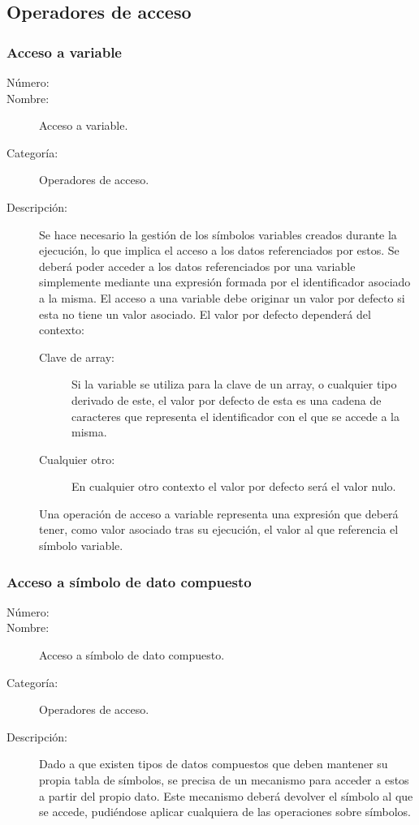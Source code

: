 \subsection{Operadores de acceso}
\subsubsection{Acceso a variable}
	\begin{description}
		\item [Número:] \cn
		\item [Nombre:] Acceso a variable.
		\item [Categoría:] Operadores de acceso.
		\item [Descripción:] Se hace necesario la gestión de los símbolos variables creados durante la ejecución, lo que implica el
		acceso a los datos referenciados por estos. Se deberá poder acceder a los datos referenciados por una variable
		simplemente mediante una expresión formada por el identificador asociado a la misma. El acceso a una variable debe originar un
		valor por defecto si esta no tiene un valor asociado. El valor por defecto dependerá del contexto:  
		\begin{description}
			\item[Clave de array:] Si la variable se utiliza para la clave de un array, o cualquier tipo
			derivado de este, el valor por defecto de esta es una cadena de caracteres que representa
			el identificador con el que se accede a la misma.
			\item [Cualquier otro:] En cualquier otro contexto el valor por defecto será el valor nulo.
		\end{description}
		Una operación de acceso a variable representa una expresión que deberá tener, como valor asociado tras su ejecución, el valor al
		que referencia el símbolo variable.
	\end {description}


\subsubsection{Acceso a símbolo de dato compuesto}
	\begin{description}
		\item [Número:] \cn
		\item [Nombre:] Acceso a símbolo de dato compuesto.
		\item [Categoría:] Operadores de acceso.
		\item [Descripción:] Dado a que existen tipos de datos compuestos que deben mantener su propia tabla de símbolos,
		se precisa de un mecanismo para acceder a estos a partir del propio dato. Este mecanismo deberá devolver el símbolo al que se
		accede, pudiéndose aplicar cualquiera de las operaciones sobre símbolos.
	\end {description}


